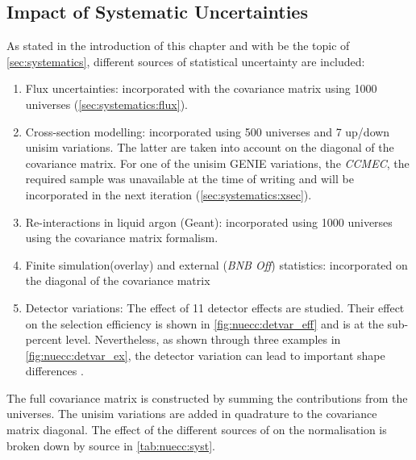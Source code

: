 \subsection{Impact of Systematic Uncertainties}
\label{sc:nuecc:syst}

As stated in the introduction of this chapter and with be the topic of \cref{sec:systematics}, different sources of statistical uncertainty are included:
\begin{enumerate}
    \item Flux uncertainties: incorporated with the covariance matrix using 1000 universes (\cref{sec:systematics:flux}).
    \item Cross-section modelling: incorporated using 500 universes and 7 up/down unisim variations. The latter are taken into account on the diagonal of the covariance matrix. For one of the unisim GENIE variations, the \textit{CCMEC}, the required sample was unavailable at the time of writing and will be incorporated in the next iteration (\cref{sec:systematics:xsec}). 
    \item Re-interactions in liquid argon (Geant): incorporated using 1000 universes using the covariance matrix formalism.
    \item Finite simulation(overlay) and external (\textit{BNB Off}) statistics: incorporated on the diagonal of the covariance matrix%
    \item Detector variations: The effect of 11 detector effects are studied. Their effect on the selection efficiency is shown in \cref{fig:nuecc:detvar_eff} and is at the sub-percent level. Nevertheless, as shown through three examples in \cref{fig:nuecc:detvar_ex}, the detector variation can lead to important shape differences .%
\end{enumerate}
The full covariance matrix is constructed by summing the contributions from the universes. The unisim variations are added in quadrature to the covariance matrix diagonal. The effect of the different sources of \systs on the normalisation is broken down by source in \cref{tab:nuecc:syst}. 

